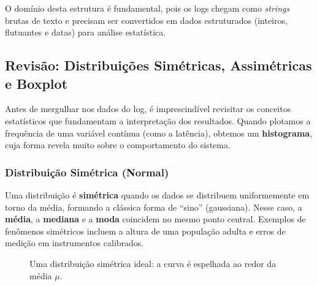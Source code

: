 \documentclass[12pt,a4paper,twoside]{report}
\begin{document}
O domínio desta estrutura é fundamental, pois os logs chegam como \textit{strings} brutas de texto e precisam ser convertidos em dados estruturados (inteiros, flutuantes e datas) para análise estatística.

\subsection{Revisão: Distribuições Simétricas, Assimétricas e Boxplot}

Antes de mergulhar nos dados do log, é imprescindível revisitar os conceitos estatísticos que fundamentam a interpretação dos resultados. Quando plotamos a frequência de uma variável contínua (como a latência), obtemos um \textbf{histograma}, cuja forma revela muito sobre o comportamento do sistema.

\subsubsection{Distribuição Simétrica (Normal)}

Uma distribuição é \textbf{simétrica} quando os dados se distribuem uniformemente em torno da média, formando a clássica forma de ``sino'' (gaussiana). Nesse caso, a \textbf{média}, a \textbf{mediana} e a \textbf{moda} coincidem no mesmo ponto central. Exemplos de fenômenos simétricos incluem a altura de uma população adulta e erros de medição em instrumentos calibrados.

\begin{figure}[h]
    \centering
    \caption{Uma distribuição simétrica ideal: a curva é espelhada ao redor da média $\mu$.}
\end{figure}
\end{document}
